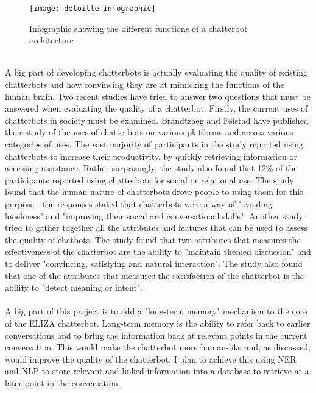 \begin{figure}[h]
	\texttt{[image: deloitte-infographic]}
	\caption{Infographic showing the different functions of a chatterbot architecture \citep{deloitte-chatbots2018}}
\end{figure}\\
A big part of developing chatterbots is actually evaluating the quality of existing chatterbots and how convincing they are at mimicking the functions of the human brain. Two recent studies have tried to answer two questions that must be answered when evaluating the quality of a chatterbot. Firstly, the current uses of chatterbots in society must be examined. Brandtzaeg and Følstad have published their study of the uses of chatterbots on various platforms and across various categories of uses. \citep{why-people-use-chatbots2017} The vast majority of participants in the study reported using chatterbots to increase their productivity, by quickly retrieving information or accessing assistance. Rather surprisingly, the study also found that 12\% of the participants reported using chatterbots for social or relational use. The study found that the human nature of chatterbots drove people to using them for this purpose - the responses stated that chatterbots were a way of "avoiding loneliness" and "improving their social and conversational skills". Another study tried to gather together all the attributes and features that can be used to assess the quality of chatbots. \citep{evaluating-chatbots2017} The study found that two attributes that measures the effectiveness of the chatterbot are the ability to "maintain themed discussion" and to deliver "convincing, satisfying and natural interaction". The study also found that one of the attributes that measures the satisfaction of the chatterbot is the ability to "detect meaning or intent".\\\\
A big part of this project is to add a "long-term memory" mechanism to the core of the ELIZA chatterbot. Long-term memory is the ability to refer back to earlier conversations and to bring the information back at relevant points in the current conversation. This would make the chatterbot more human-like and, as discussed, would improve the quality of the chatterbot. I plan to achieve this using NER and NLP to store relevant and linked information into a database to retrieve at a later point in the conversation.
